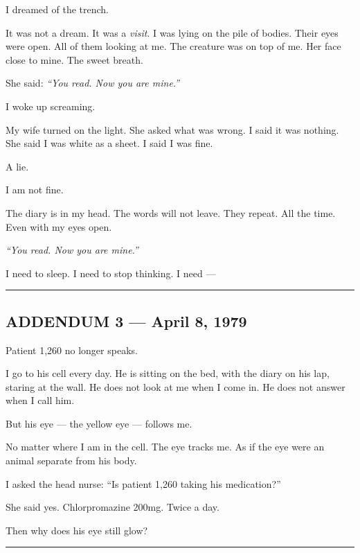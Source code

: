 \noindent I dreamed of the trench.

\noindent It was not a dream. It was a \textit{visit}. I was lying on the pile of bodies. Their eyes were open. All of them looking at me. The creature was on top of me. Her face close to mine. The sweet breath.

\noindent She said: \textit{\textquotedblleft{}You read. Now you are mine.\textquotedblright{}}

\noindent I woke up screaming.

\noindent My wife turned on the light. She asked what was wrong. I said it was nothing. She said I was white as a sheet. I said I was fine.

\noindent A lie.

\noindent I am not fine.

\noindent The diary is in my head. The words will not leave. They repeat. All the time. Even with my eyes open.

\noindent \textit{\textquotedblleft{}You read. Now you are mine.\textquotedblright{}}

\noindent I need to sleep. I need to stop thinking. I need ---

\vspace{0.5em}\noindent\rule{\textwidth}{0.5pt}\vspace{0.5em}

\subsection*{ADDENDUM 3 --- April 8, 1979}

\noindent Patient 1,260 no longer speaks.

\noindent I go to his cell every day. He is sitting on the bed, with the diary on his lap, staring at the wall. He does not look at me when I come in. He does not answer when I call him.

\noindent But his eye --- the yellow eye --- follows me.

\noindent No matter where I am in the cell. The eye tracks me. As if the eye were an animal separate from his body.

\noindent I asked the head nurse: \textquotedblleft{}Is patient 1,260 taking his medication?\textquotedblright{}

\noindent She said yes. Chlorpromazine 200mg. Twice a day.

\noindent Then why does his eye still glow?

\vspace{0.5em}\noindent\rule{\textwidth}{0.5pt}\vspace{0.5em}

